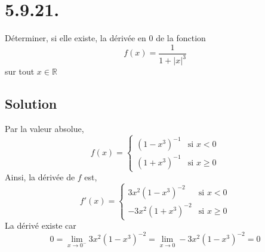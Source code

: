 \section*{5.9.21.}
	Déterminer, si elle existe, la dérivée en 0 de la fonction 
	\[f(x)=\frac{1}{1+|x|^3}\] sur tout $x\in\mathbb{R}$
	\subsection*{Solution}
		Par la valeur absolue,
		\[f(x)=\begin{cases}
		(1-x^3)^{-1} & \text{si } x<0\\
		(1+x^3)^{-1} & \text{si } x\geq 0
		\end{cases}\]
		Ainsi, la dérivée de $f$ est,
		\[f'(x)=\begin{cases}
		3x^2(1-x^3)^{-2} & \text{si } x<0\\
		-3x^2(1+x^3)^{-2} & \text{si } x\geq 0
		\end{cases}\]
		La dérivé existe car 
		\[0=\lim_{x\to 0^-}3x^2(1-x^3)^{-2}=\lim_{x\to 0}-3x^2(1-x^3)^{-2}=0\]